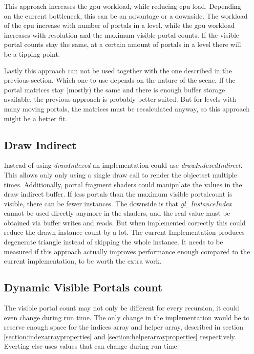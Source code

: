 This approach increases the \gls{gpu} workload, while reducing \gls{cpu} load. Depending on the current bottleneck, this can be an advantage or a downside. The workload of the \gls{cpu} increase with number of portals in a level, while the \gls{gpu} workload increases with resolution and the maximum visible portal counts. If the visible portal counts stay the same, at a certain amount of portals in a level there will be a tipping point.

Lastly this approach can not be used together with the one described in the previous section. Which one to use depends on the nature of the scene. If the portal matrices stay (mostly) the same and there is enough buffer storage available, the previous approach is probably better suited. But for levels with many moving portals, the matrices must be recalculated anyway, so this approach might be a better fit. 





\subsection{Draw Indirect}
Instead of using \textit{drawIndexed} an implementation could use \textit{drawIndexedIndirect}. This allows only only using a single draw call to render the \gls{objectset} multiple times. Additionally, portal fragment shaders could manipulate the values in the draw indirect buffer. If less portals than the maximum visible \gls{portalcount} is visible, there can be fewer instances. The downside is that \textit{gl\_InstanceIndex} cannot be used directly anymore in the shaders, and the real value must be obtained via buffer writes and reads. But when implemented correctly this could reduce the drawn instance count by a lot. The current Implementation produces degenerate triangle instead of skipping the whole instance. It needs to be measured if this approach actually improves performance enough compared to the current implementation, to be worth the extra work.


\subsection{Dynamic Visible Portals count}
The visible portal count may not only be different for every recursion, it could even change during run time. The only change in the implementation would be to reserve enough space for the indices array and helper array, described in section \ref{section:indexarrayproperties} and \ref{section:helperarrayproperties} respectively. Everting else uses values that can change during run time.

